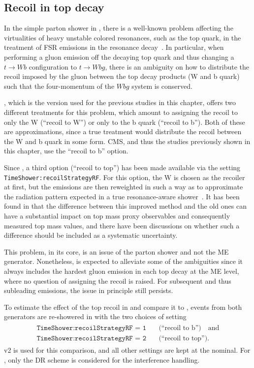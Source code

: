 \subsection{Recoil in top decay}
\label{sec:bb4l:recoil}

In the simple parton shower in \pythia, there is a well-known problem affecting the virtualities of heavy unstable colored resonances, such as the top quark, in the treatment of FSR emissions in the resonance decay~\cite{Brooks:2019xso}. In particular, when performing a gluon emission off the decaying top quark and thus changing a $t \rightarrow Wb$ configuration to $t \rightarrow Wbg$, there is an ambiguity on how to distribute the recoil imposed by the gluon between the top decay products (W and b quark) such that the four-momentum of the $Wbg$ system is conserved.

, which is the version used for the previous studies in this chapter, offers two different treatments for this problem, which amount to assigning the recoil to only the W (``recoil to W'') or only to the b quark (``recoil to b''). Both of these are approximations, since a true treatment would distribute the recoil between the W and b quark in some form. CMS, and thus the studies previously shown in this chapter, use the ``recoil to b'' option.

Since , a third option (``recoil to top'') has been made available via the setting \texttt{TimeShower:recoilStrategyRF}. For this option, the W is chosen as the recoiler at first, but the emissions are then reweighted in such a way as to approximate the radiation pattern expected in a true resonance-aware shower~\cite{Brooks:2019xso}. It has been found in  that the difference between this improved method and the old ones can have a substantial impact on top mass proxy observables and consequently measured top mass values, and there have been discussions on whether such a difference should be included as a systematic uncertainty.

This problem, in its core, is an issue of the parton shower and not the ME generator. Nonetheless, \bbfourl is expected to alleviate some of the ambiguities since it always includes the hardest gluon emission in each top decay at the ME level, where no question of assigning the recoil is raised. For subsequent and thus subleading emissions, the issue in principle still persists.

To estimate the effect of the top recoil in \bbfourl and compare it to \tttWsum, events from both generators are re-showered in  with the two choices of setting
\begin{align*}
\begin{split}
  \texttt{TimeShower:recoilStrategyRF = 1} &\quad \text{(``recoil to b'')} \quad \text{and} \\
  \texttt{TimeShower:recoilStrategyRF = 2} &\quad \text{(``recoil to top'')}.
\end{split}
\end{align*}
\bbfourl v2 is used for this comparison, and all other settings are kept at the nominal. For \tttWsum, only the DR scheme is considered for the interference handling.

